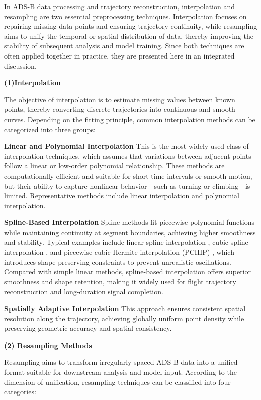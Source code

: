 In ADS-B data processing and trajectory reconstruction, interpolation and resampling are two essential preprocessing techniques.
Interpolation focuses on repairing missing data points and ensuring trajectory continuity, while resampling aims to unify the temporal or spatial distribution of data, thereby improving the stability of subsequent analysis and model training.
Since both techniques are often applied together in practice, they are presented here in an integrated discussion.

\textbf{(1)Interpolation}

The objective of interpolation is to estimate missing values between known points, thereby converting discrete trajectories into continuous and smooth curves.
Depending on the fitting principle, common interpolation methods can be categorized into three groups:

\textbf{Linear and Polynomial Interpolation}
This is the most widely used class of interpolation techniques, which assumes that variations between adjacent points follow a linear or low-order polynomial relationship.
These methods are computationally efficient and suitable for short time intervals or smooth motion, but their ability to capture nonlinear behavior—such as turning or climbing—is limited.
Representative methods include linear interpolation \cite{lindner2021aircraft} and polynomial interpolation.

\textbf{Spline-Based Interpolation}
Spline methods fit piecewise polynomial functions while maintaining continuity at segment boundaries, achieving higher smoothness and stability.
Typical examples include linear spline interpolation \cite{sun2019wrap}, cubic spline interpolation \cite{shafienya20224d}, and piecewise cubic Hermite interpolation (PCHIP) \cite{10311324}, which introduces shape-preserving constraints to prevent unrealistic oscillations.
Compared with simple linear methods, spline-based interpolation offers superior smoothness and shape retention, making it widely used for flight trajectory reconstruction and long-duration signal completion.

\textbf{Spatially Adaptive Interpolation}
This approach ensures consistent spatial resolution along the trajectory, achieving globally uniform point density while preserving geometric accuracy and spatial consistency.

\textbf{(2) Resampling Methods}

Resampling aims to transform irregularly spaced ADS-B data into a unified format suitable for downstream analysis and model input.
According to the dimension of unification, resampling techniques can be classified into four categories:

